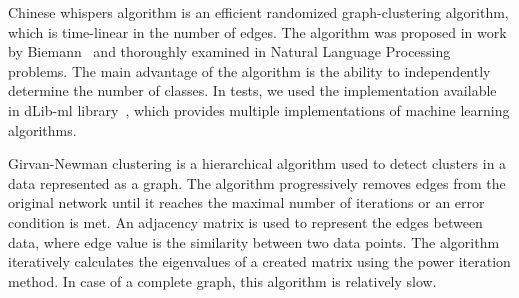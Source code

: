 Chinese whispers algorithm is an efficient randomized graph-clustering algorithm, which is time-linear in the number of edges.
The algorithm was proposed in work by Biemann~\cite{CW1} and thoroughly examined in Natural Language Processing problems. 
The main advantage of the algorithm is the ability to independently determine the number of classes. 
In tests, we used the implementation available in dLib-ml library~\cite{dlib}, which provides multiple implementations of machine learning algorithms.

Girvan-Newman clustering is a hierarchical algorithm used to detect clusters in a data represented as a graph.
The algorithm progressively removes edges from the original network until it reaches the maximal number of iterations or an error condition is met.
An adjacency matrix is used to represent the edges between data, where edge value is the similarity between two data points.
The algorithm iteratively calculates the eigenvalues of a created matrix using the power iteration method. 
In case of a complete graph, this algorithm is relatively slow.

